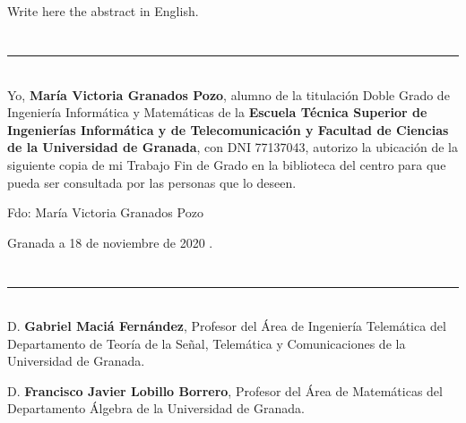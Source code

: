 \\

\vspace{0.7cm}
\\

Write here the abstract in English.

\chapter*{}
\thispagestyle{empty}

\noindent\rule[-1ex]{\textwidth}{2pt}\\[4.5ex]

Yo, \textbf{María Victoria Granados Pozo}, alumno de la titulación Doble Grado de Ingeniería Informática y Matemáticas de la \textbf{Escuela Técnica Superior
de Ingenierías Informática y de Telecomunicación y Facultad de Ciencias de la Universidad de Granada}, con DNI 77137043, autorizo la
ubicación de la siguiente copia de mi Trabajo Fin de Grado en la biblioteca del centro para que pueda ser
consultada por las personas que lo deseen.

\vspace{6cm}

\noindent Fdo: María Victoria Granados Pozo

\vspace{2cm}

\begin{flushright}
Granada a 18 de noviembre de 2020 .
\end{flushright}


\chapter*{}
\thispagestyle{empty}

\noindent\rule[-1ex]{\textwidth}{2pt}\\[4.5ex]

D. \textbf{Gabriel Maciá Fernández}, Profesor del Área de Ingeniería Telemática del Departamento de Teoría de la Señal, Telemática y Comunicaciones de la Universidad de Granada.

\vspace{0.5cm}

D. \textbf{Francisco Javier Lobillo Borrero}, Profesor del Área de Matemáticas del Departamento Álgebra de la Universidad de Granada.


